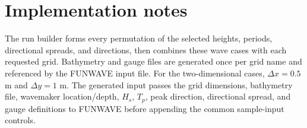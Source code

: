 \documentclass[11pt]{article}
\begin{document}
\section{Implementation notes}
The run builder forms every permutation of the selected heights, periods, directional spreads, and directions, then combines these wave cases with each requested grid.  Bathymetry and gauge files are generated once per grid name and referenced by the FUNWAVE input file.  For the two-dimensional cases, $\Delta x=0.5$ m and $\Delta y=1$ m.  The generated input passes the grid dimensions, bathymetry file, wavemaker location/depth, $H_s$, $T_p$, peak direction, directional spread, and gauge definitions to FUNWAVE before appending the common sample-input controls.
\end{document}
